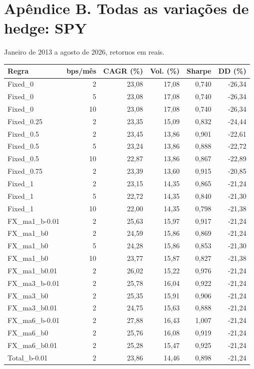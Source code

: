 \documentclass[11pt,a4paper]{article}
\begin{document}
\section*{Apêndice B. Todas as variações de hedge: SPY}Janeiro de 2013 a agosto de 2026, retornos em reais.\par \footnotesize\begin{center}\begin{tabular}{lrrrrr}\toprule
Regra & bps/mês & CAGR (\%) & Vol. (\%) & Sharpe & DD (\%) \\ \midrule
Fixed\_0 & 2 & 23,08 & 17,08 & 0,740 & -26,34 \\
Fixed\_0 & 5 & 23,08 & 17,08 & 0,740 & -26,34 \\
Fixed\_0 & 10 & 23,08 & 17,08 & 0,740 & -26,34 \\
Fixed\_0.25 & 2 & 23,35 & 15,09 & 0,832 & -24,44 \\
Fixed\_0.5 & 2 & 23,45 & 13,86 & 0,901 & -22,61 \\
Fixed\_0.5 & 5 & 23,24 & 13,86 & 0,888 & -22,72 \\
Fixed\_0.5 & 10 & 22,87 & 13,86 & 0,867 & -22,89 \\
Fixed\_0.75 & 2 & 23,39 & 13,60 & 0,915 & -20,85 \\
Fixed\_1 & 2 & 23,15 & 14,35 & 0,865 & -21,24 \\
Fixed\_1 & 5 & 22,72 & 14,35 & 0,840 & -21,30 \\
Fixed\_1 & 10 & 22,00 & 14,35 & 0,798 & -21,38 \\
FX\_ma1\_b-0.01 & 2 & 25,63 & 15,97 & 0,917 & -21,24 \\
FX\_ma1\_b0 & 2 & 24,59 & 15,86 & 0,869 & -21,24 \\
FX\_ma1\_b0 & 5 & 24,28 & 15,86 & 0,853 & -21,30 \\
FX\_ma1\_b0 & 10 & 23,77 & 15,87 & 0,827 & -21,38 \\
FX\_ma1\_b0.01 & 2 & 26,02 & 15,22 & 0,976 & -21,24 \\
FX\_ma3\_b-0.01 & 2 & 25,78 & 16,04 & 0,922 & -21,24 \\
FX\_ma3\_b0 & 2 & 25,35 & 15,91 & 0,906 & -21,24 \\
FX\_ma3\_b0.01 & 2 & 24,75 & 15,63 & 0,888 & -21,24 \\
FX\_ma6\_b-0.01 & 2 & 27,88 & 16,43 & 1,007 & -21,24 \\
FX\_ma6\_b0 & 2 & 25,76 & 16,08 & 0,919 & -21,24 \\
FX\_ma6\_b0.01 & 2 & 25,28 & 15,47 & 0,925 & -21,24 \\
Total\_b-0.01 & 2 & 23,86 & 14,46 & 0,898 & -21,24 \\

\end{tabular}
\end{center}
\end{document}
